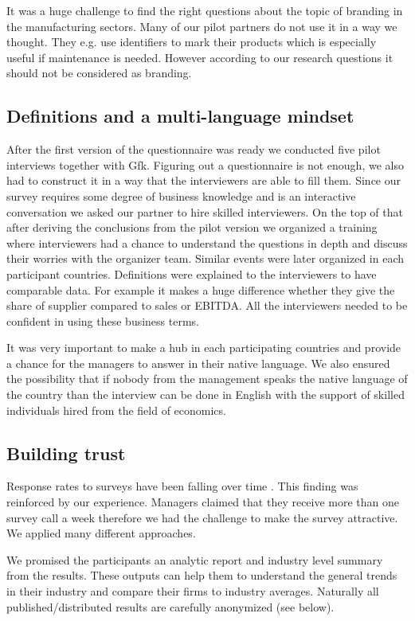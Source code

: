 \documentclass[final, dvipsnames, authoryear,12pt]{elsarticle}
\begin{document}
It was a huge challenge to find the right questions about the topic of branding in the manufacturing sectors. Many of our pilot partners do not use it in a way we thought. They e.g. use identifiers to mark their products which is especially useful if maintenance is needed. However according to our research questions it should not be considered as branding.

\subsection{Definitions and a multi-language mindset}

After the first version of the questionnaire was ready we conducted five pilot interviews together with Gfk. Figuring out a questionnaire is not enough, we also had to construct it in a way that the interviewers are able to fill them. Since our survey requires some degree of business knowledge and is an interactive conversation we asked our partner to hire skilled interviewers. On the top of that after deriving the conclusions from the pilot version we organized a training where interviewers had a chance to understand the questions in depth and discuss their worries with the organizer team. Similar events were later organized in each participant countries. Definitions were explained to the interviewers to have comparable data. For example it makes a huge difference whether they give the share of supplier compared to sales or EBITDA. All the interviewers needed to be confident in using these business terms.

It was very important to make a hub in each participating countries and provide a chance for the managers to answer in their native language. We also ensured the possibility that if nobody from the management speaks the native language of the country than the interview can be done in English with the support of skilled individuals hired from the field of economics.

\subsection{Building trust}

Response rates to surveys have been falling over time \cite{Bloom2014-hc}. This finding was reinforced by our experience. Managers claimed that they receive more than one survey call a week therefore we had the challenge to make the survey attractive. We applied many different approaches.

We promised the participants an analytic report and industry level summary from the results. These outputs can help them to understand the general trends in their industry and compare their firms to industry averages. Naturally all published/distributed results are carefully anonymized (see below).
\end{document}
